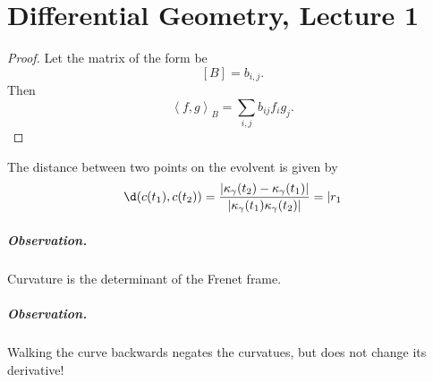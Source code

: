 \chapter{Differential Geometry, Lecture 1}


\begin{proof}
    Let the matrix of the form be
    \[ 
        [B] = b_{i, j}.
   \]
   Then
   \[ 
       \left\langle f, g \right\rangle_B = \sum_{i, j} b_{ij}f_ig_j.  
  \]
\end{proof}

\begin{lemma}\label{EvolventDistanceFormula}
    The distance between two points on the evolvent is given by
    \[
        \d (c(t_1), c(t_2) ) = \frac{ \lvert \kappa_\gamma(t_2) - \kappa_\gamma(t_1) \rvert}{\lvert \kappa_\gamma(t_1) \kappa_\gamma(t_2) \rvert } = \lvert r_1
    \]
\end{lemma}

\paragraph{Observation.} Curvature is the determinant of the Frenet frame.
\paragraph{Observation.} Walking the curve backwards negates the curvatues, but does not change its derivative!

